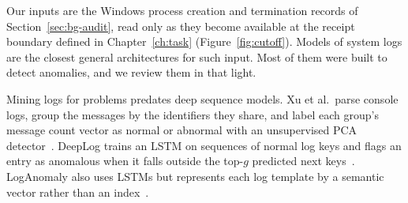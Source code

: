 Our inputs are the Windows process creation and termination records of
Section~\ref{sec:bg-audit}, read only as they become available at the
receipt boundary defined in Chapter~\ref{ch:task}
(Figure~\ref{fig:cutoff}).
Models of system logs are the closest general architectures for such
input. Most of them were built to detect anomalies, and we review them
in that light.

Mining logs for problems predates deep sequence models. Xu et al.\
parse console logs, group the messages by the identifiers they share,
and label each group's message count vector as normal or abnormal with
an unsupervised PCA detector~\cite{xu2009detecting}.
DeepLog trains an LSTM
\cite{hochreiter1997long} on sequences of normal log keys and flags an entry as
anomalous when it falls outside the top-$g$ predicted next
keys~\cite{du2017deeplog}.
LogAnomaly also uses LSTMs but represents each log template by a
semantic vector rather than an index~\cite{meng2019loganomaly}.

